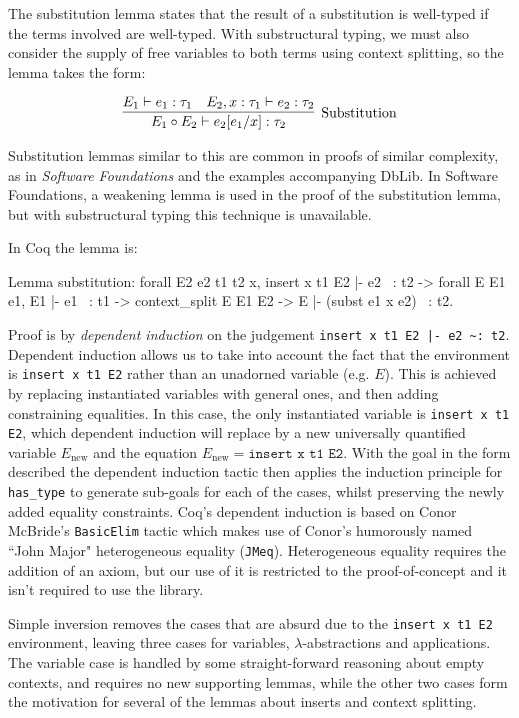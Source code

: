 \documentclass[]{unswthesis}
\newcommand{\types}{\vdash}
\let\c\texttt
\let\i\textit
\begin{document}
The substitution lemma states that the result of a substitution is well-typed if the terms involved are well-typed. With substructural typing, we must also consider the supply of free variables to both terms using context splitting, so the lemma takes the form:

\begin{eqnarray*}
\infer[\text{Substitution}]{
    E_1 \circ E_2 \types e_2 [e_1/x] : \tau_2
}{
    E_1 \types e_1 : \tau_1 \quad E_2, x : \tau_1 \types e_2 : \tau_2
}
\end{eqnarray*}

Substitution lemmas similar to this are common in proofs of similar complexity, as in \i{Software Foundations} \cite{pierce15} and the examples accompanying DbLib. In Software Foundations, a weakening lemma is used in the proof of the substitution lemma, but with substructural typing this technique is unavailable.

In Coq the lemma is:

\begin{coqcode}
Lemma substitution: forall E2 e2 t1 t2 x,
  insert x t1 E2 |- e2 ~: t2 ->
  forall E E1 e1, E1 |- e1 ~: t1 ->
  context_split E E1 E2 ->
  E |- (subst e1 x e2) ~: t2.
\end{coqcode}

Proof is by \i{dependent induction} on the judgement \c{insert x t1 E2 |- e2 \textasciitilde: t2}. Dependent induction allows us to take into account the fact that the environment is \c{insert x t1 E2} rather than an unadorned variable (e.g. $E$). This is achieved by replacing instantiated variables with general ones, and then adding constraining equalities. In this case, the only instantiated variable is \c{insert x t1 E2}, which dependent induction will replace by a new universally quantified variable $E_\text{new}$ and the equation $E_\text{new} = \c{insert x t1 E2}$. With the goal in the form described the dependent induction tactic then applies the induction principle for \c{has_type} to generate sub-goals for each of the cases, whilst preserving the newly added equality constraints. Coq's dependent induction is based on Conor McBride's \c{BasicElim} tactic \cite{mcbride00} which makes use of Conor's humorously named ``John Major" heterogeneous equality (\c{JMeq}). Heterogeneous equality requires the addition of an axiom, but our use of it is restricted to the proof-of-concept and it isn't required to use the library.

Simple inversion removes the cases that are absurd due to the \c{insert x t1 E2} environment, leaving three cases for variables, $\lambda$-abstractions and applications. The variable case is handled by some straight-forward reasoning about empty contexts, and requires no new supporting lemmas, while the other two cases form the motivation for several of the lemmas about inserts and context splitting.
\end{document}
